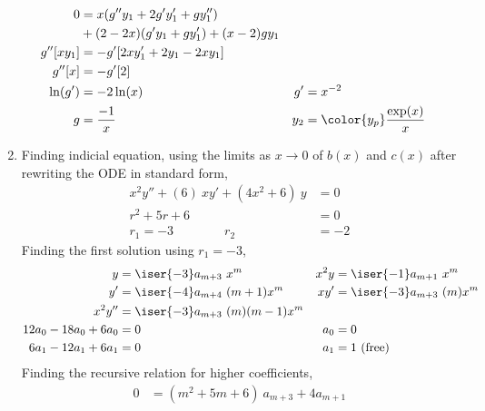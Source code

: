 \begin{enumerate}
\begin{align}
              0         & = x(g''y_1 + 2g'y_1' + gy_1'')        \\
                        & + (2-2x)(g'y_1 + gy_1') + (x-2)gy_1   \\
              g''[xy_1] & = -g' [2xy_1' + 2y_1 - 2xy_1]         \\
              g''[x]    & = -g' [2]                             \\
              \ln(g')   & = -2\ln(x)                          &
              g'        & = x^{-2}                              \\
              g         & = \frac{-1}{x}                      &
              y_2       & = \color{y_p} \frac{\exp(x)}{x}
          \end{align}

    \item Finding indicial equation, using the limits as $ x \to 0 $
          of $ b(x) $ and $ c(x) $ after rewriting the ODE in standard form,
          \begin{align}
              x^2y'' + (6)\ xy' + (4x^2 + 6)\ y & = 0  \\
              r^2 + 5r + 6                      & = 0  \\
              r_1 = -3 \qquad\qquad r_2         & = -2
          \end{align}
          Finding the first solution using $ r_1 = -3 $,
          \begin{align}
              y                    & = \iser{-3}a_{m+3}\ x^{m}          &
              x^2 y                & = \iser{-1}a_{m+1}\ x^{m}            \\
              y'                   & = \iser{-4}a_{m+4}\ (m+1)x^{m}     &
              xy'                  & = \iser{-3}a_{m+3}\ (m)x^{m}         \\
              x^2 y''              & =  \iser{-3}a_{m+3}\ (m)(m-1)x^{m} & \\
              12a_0 - 18a_0 + 6a_0 & = 0                                &
              a_0                  & = 0                                  \\
              6a_1 - 12 a_1 + 6a_1 & = 0                                &
              a_1                  & = 1\ (\text{free})
          \end{align}
          Finding the recursive relation for higher coefficients,
          \begin{align}
              0       & = (m^2 + 5m + 6)\ a_{m+3} + 4a_{m+1}          \\

\end{align}
\end{enumerate}

